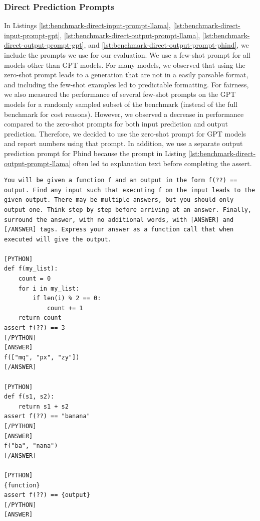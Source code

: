 \subsubsection{Direct Prediction Prompts} \label{sec:appendix-direct-prompts}
In Listings \ref{lst:benchmark-direct-input-prompt-llama}, \ref{lst:benchmark-direct-input-prompt-gpt}, \ref{lst:benchmark-direct-output-prompt-llama}, \ref{lst:benchmark-direct-output-prompt-gpt}, and \ref{lst:benchmark-direct-output-prompt-phind}, we include the prompts we use for our evaluation. We use a few-shot prompt for all models other than GPT models. For many models, we observed that using the zero-shot prompt leads to a generation that are not in a easily parsable format, and including the few-shot examples led to predictable formatting. For fairness, we also measured the performance of several few-shot prompts on the GPT models for a randomly sampled subset of the benchmark (instead of the full benchmark for cost reasons). However, we observed a decrease in performance compared to the zero-shot prompts for both input prediction and output prediction. Therefore, we decided to use the zero-shot prompt for GPT models and report numbers using that prompt. In addition, we use a separate output prediction prompt for Phind because the prompt in Listing  \ref{lst:benchmark-direct-output-prompt-llama} often led to explanation text before completing the assert. 

\begin{lstlisting}[caption={Input Prediction (non-GPT)},label={lst:benchmark-direct-input-prompt-llama}, captionpos=t, breaklines=true]
You will be given a function f and an output in the form f(??) == output. Find any input such that executing f on the input leads to the given output. There may be multiple answers, but you should only output one. Think step by step before arriving at an answer. Finally, surround the answer, with no additional words, with [ANSWER] and [/ANSWER] tags. Express your answer as a function call that when executed will give the output.

[PYTHON]
def f(my_list):
    count = 0
    for i in my_list:
        if len(i) % 2 == 0:
            count += 1
    return count
assert f(??) == 3
[/PYTHON]
[ANSWER]
f(["mq", "px", "zy"])
[/ANSWER]

[PYTHON]
def f(s1, s2):
    return s1 + s2
assert f(??) == "banana"
[/PYTHON]
[ANSWER]
f("ba", "nana")
[/ANSWER]

[PYTHON]
{function}
assert f(??) == {output}
[/PYTHON]
[ANSWER]
\end{lstlisting}

